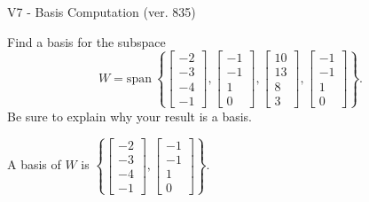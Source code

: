 \begin{exercise}
  \begin{exerciseTitle}V7 - Basis Computation (ver. 835)\end{exerciseTitle}
  \begin{exerciseStatement}
    Find a basis for the subspace 
\[W=\mathrm{span}\ \left\{\left[\begin{array}{r}
-2 \\
-3 \\
-4 \\
-1
\end{array}\right] , \left[\begin{array}{r}
-1 \\
-1 \\
1 \\
0
\end{array}\right] , \left[\begin{array}{r}
10 \\
13 \\
8 \\
3
\end{array}\right] , \left[\begin{array}{r}
-1 \\
-1 \\
1 \\
0
\end{array}\right]\right\}.\]
 Be sure to explain why your result is a basis.


  \end{exerciseStatement}
  \begin{exerciseAnswer}
   A basis of \(W\) is  \(\left\{\left[\begin{array}{r}
-2 \\
-3 \\
-4 \\
-1
\end{array}\right] , \left[\begin{array}{r}
-1 \\
-1 \\
1 \\
0
\end{array}\right]\right\}\).
  


  \end{exerciseAnswer}
\end{exercise}